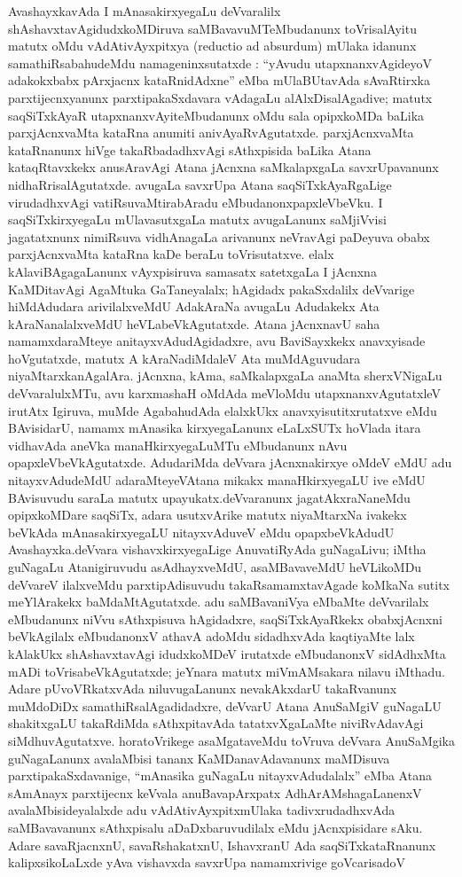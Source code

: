 AvashayxkavAda I mAnasakirxyegaLu deVvaralilx shAshavxtavAgidudxkoMDiruva saMBava\-vuMTeMbudanunx toVrisalAyitu matutx oMdu vAdAtivAyxpitxya {\rm(reductio ad absurdum)} mUlaka idanunx samathiRsabahudeMdu namageninxsutatxde : ``yAvudu utapxnanxvAgideyoV adakokxbabx pArxjacnx kataRnidAdxne'' eMba mUlaBUtavAda sAvaR\-tirxka parxtijecnxyanunx parxtipakaSxdavara vAdagaLu alAlxDisalAgadive; matutx saqSiTxkAyaR utapxnanx\-vAyiteMbudanunx oMdu sala opipxkoMDa baLika parxjAcnxvaMta kataRna anumiti ani\-vAyaRvAgutatxde. parxjAcnxvaMta kataRnanunx hiVge takaRbadadhxvAgi sAthxpisida baLika Atana kataqRtavxkekx anusAravAgi Atana jAcnxna saMkalapxgaLa savxrUpavanunx nidhaRrisalAgutatxde. avu\-gaLa savxrUpa Atana saqSiTxkAyaRgaLige virudadhxvAgi vatiRsuvaMtirabAradu eMbuda\-nonxpapxleVbeVku. I saqSiTxkirxyegaLu mUlavasutxgaLa matutx avugaLanunx saMjiVvisi jaga\-tatxnunx nimiRsuva vidhAnagaLa arivanunx neVravAgi paDeyuva obabx parxjAcnxvaMta kataRna kaDe beraLu toVrisutatxve. elalx kAlaviBAgagaLanunx vAyxpisiruva samasatx satetxgaLa I jAcnxna KaMDitavAgi AgaMtuka GaTaneyalalx; hAgidadx pakaSxdalilx deVvarige hiMdAdudara arivilalxveMdU AdakAraNa avugaLu Adudakekx Ata kAraNanalalxveMdU heVLabeVkAgutatxde. Atana jAcnxnavU saha namamxdaraMteye anitayxvAdudAgidadxre, avu BaviSayxkekx anavxyisade hoVgutatxde, matutx A kAraNadiMdaleV Ata muMdAguvudara niyaMtarxkanAgalAra. jAcnxna, kAma, saMkalapxgaLa anaMta sherxVNigaLu deVvaralulxMTu, avu karxmashaH oMdAda meVloMdu utapxnanxvAgutatxleV irutAtx Igiruva, muMde AgabahudAda elalxkUkx anavxyisutitxrutatxve eMdu BAvisidarU, namamx mAnasika kirxyegaLanunx eLaLxSUTx hoVlada itara vidhavAda aneVka manaHkirxyegaLuMTu eMbudanunx nAvu opapxleVbeVkAgutatxde. AdudariMda deVvara jAcnxnakirxye oMdeV eMdU adu nitayxvAdudeMdU adaraMteyeV\break Atana mikakx manaHkirxyegaLU ive eMdU BAvisuvudu saraLa matutx upayukatx.\break deVvaranunx jagatAkxraNaneMdu opipxkoMDare saqSiTx, adara usutxvArike matutx niyaM\-tarxNa ivakekx beVkAda mAnasakirxyegaLU nitayxvAduveV eMdu opapxbeVkAdudU Avashayxka.\break deVvara vishavxkirxyegaLige AnuvatiRyAda guNagaLivu; iMtha guNagaLu Atanigiruvudu asAdhayxveMdU, asaMBavaveMdU heVLikoMDu deVvareV ilalxveMdu parxtipAdisuvudu takaRsamamxtavAgade koMkaNa sutitx meYlArakekx baMdaMtAgutatxde. adu saMBavaniVya eMbaMte deVvarilalx eMbudanunx niVvu sAthxpisuva hAgidadxre, saqSiTxkAyaRkekx obabx\break jAcnxni beVkAgilalx eMbudanonxV athavA adoMdu sidadhxvAda kaqtiyaMte lalx kAlakUkx shAshavxtavAgi idudxkoMDeV irutatxde eMbudanonxV sidAdhxMta mADi toVrisabeVkAgu\-tatxde; jeYnara matutx miVmAMsakara nilavu iMthadu. Adare pUvoVRkatxvAda niluvu\-gaLanunx nevakAkxdarU takaRvanunx muMdoDiDx samathiRsalAgadidadxre, deVvarU Atana AnuSaMgiV guNagaLU shakitxgaLU takaRdiMda sAthxpitavAda tatatxvXgaLaMte niviRvAdavAgi siMdhuvAgutatxve. horatoVrikege asaMgataveMdu toVruva deVvara AnuSaMgika guNagaLanunx avalaMbisi tananx KaMDanavAdavanunx maMDisuva parxtipakaSxdavanige, ``mAnasika guNagaLu nitayxvAdudalalx'' eMba Atana sAmAnayx parxtijecnx keVvala anuBavapArxpatx AdhArAMshagaLanenxV avalaMbisideyalalxde adu vAdAtivAyxpitxmUlaka tadivxrudadhxvAda saMBavavanunx sAthxpisalu aDaDxbaruvudilalx eMdu jAcnxpisidare sAku. Adare savaRjacnxnU, savaRshakatxnU, IshavxranU Ada saqSiTxkataRnanunx kalipxsikoLaLxde yAva vishavxda savxrUpa namamxrivige goVcarisadoV 